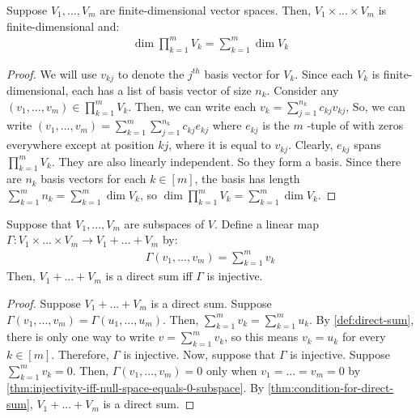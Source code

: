\documentclass{article}
\begin{document}
\begin{theorem}
  \label{thm:dimension-of-product-vector-space-is-sum-of-dimensions}
  Suppose $V_1, ..., V_m$ are finite-dimensional vector spaces. Then,
  $V_1 \times ... \times V_m$ is finite-dimensional and:
  \begin{align*}
    \dim \prod_{k=1}^m V_k = \sum_{k=1}^m \dim V_k
  \end{align*}
\end{theorem}
\begin{proof}
  We will use $v_{kj}$ to denote the $j^{th}$ basis vector for
  $V_k$. Since each $V_k$ is finite-dimensional, each has a list of
  basis vector of size $n_k$. Consider any $(v_1, ..., v_m) \in
  \prod_{k=1}^m V_k$. Then, we can write each $v_k = \sum_{j=1}^{n_k}
  c_{kj} v_{kj}$, So, we can write $(v_1, ..., v_m) = \sum_{k=1}^m
  \sum_{j=1}^{n_k} c_{kj} e_{kj}$ where $e_{kj}$ is the $m$ -tuple of
  with zeros everywhere except at position $kj$, where it is equal to
  $v_{kj}$. Clearly, $e_{kj}$ spans $\prod_{k=1}^m V_k$. They are also
  linearly independent. So they form a basis. Since there are $n_k$
  basis vectors for each $k \in [m]$, the basis has length
  $\sum_{k=1}^m n_k = \sum_{k=1}^m \dim V_k$, so $\dim \prod_{k=1}^m
  V_k = \sum_{k=1}^m \dim V_k$.
\end{proof}

\begin{theorem}
  \label{thm:products-and-direct-sums}
  Suppose that $V_1, ..., V_m$ are subspaces of $V$. Define a linear
  map $\Gamma: V_1 \times ... \times V_m \rightarrow V_1 + ... + V_m$
  by:
  \begin{align*}
    \Gamma(v_1, ..., v_m) = \sum_{k=1}^m v_k
  \end{align*}
  Then, $V_1 + ... + V_m$ is a direct sum iff $\Gamma$ is injective.
\end{theorem}
\begin{proof}
  Suppose $V_1 + ... + V_m$ is a direct sum. Suppose $\Gamma(v_1, ...,
  v_m) = \Gamma(u_1, ..., u_m)$. Then, $\sum_{k=1}^m v_k =
  \sum_{k=1}^m u_k$. By \cref{def:direct-sum}, there is only one way
  to write $v = \sum_{k=1}^m v_k$, so this means $v_k = u_k$ for every
  $k \in [m]$. Therefore, $\Gamma$ is injective. Now, suppose that
  $\Gamma$ is injective. Suppose $\sum_{k=1}^m v_k = 0$. Then, $\Gamma(v_1, ..., v_m) = 0$ only when
  $v_1 = ... = v_m = 0$ by
  \cref{thm:injectivity-iff-null-space-equals-0-subspace}. By
  \cref{thm:condition-for-direct-sum}, $V_1 + ... + V_m$ is a direct sum. 
\end{proof}
\end{document}
